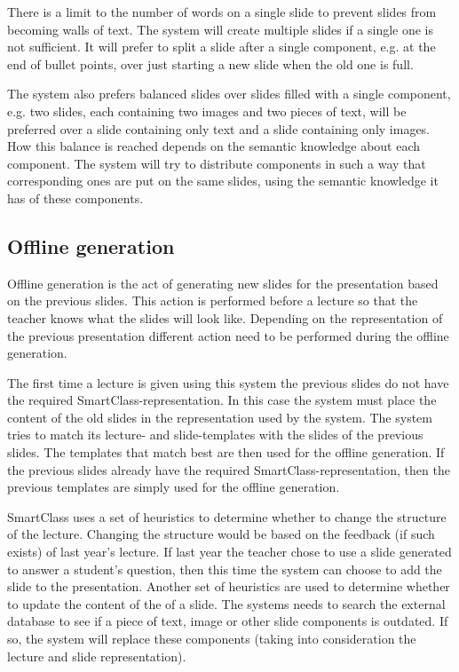 \documentclass[11pt]{article}
\begin{document}
There is a limit to the number of words on a single slide to prevent slides from becoming walls of text. The system will create multiple slides if a single one is not sufficient. It will prefer to split a slide after a single component, e.g. at the end of bullet points, over just starting a new slide when the old one is full. 

The system also prefers balanced slides over slides filled with a single component, e.g. two slides, each containing two images and two pieces of text, will be preferred over a slide containing only text and a slide containing only images. How this balance is reached depends on the semantic knowledge about each component. The system will try to distribute components in such a way that corresponding ones are put on the same slides, using the semantic knowledge it has of these components. 

\subsection{Offline generation}
Offline generation is the act of generating new slides for the presentation based on the previous slides. This action is performed before a lecture so that the teacher knows what the slides will look like. Depending on the representation of the previous presentation different action need to be performed during the offline generation. 

The first time a lecture is given using this system the previous slides do not have the required SmartClass-representation. In this case the system must place the content of the old slides in the representation used by the system. The system tries to match its lecture- and slide-templates with the slides of the previous slides. The templates that match best are then used for the offline generation. If the previous slides already have the required SmartClass-representation, then the previous templates are simply used for the offline generation.

SmartClass uses a set of heuristics to determine whether to change the structure of the lecture. Changing the structure would be based on the feedback (if such exists) of last year's lecture. If last year the teacher chose to use a slide generated to answer a student's question, then this time the system can choose to add the slide to the presentation. Another set of heuristics are used to determine whether to update the content of the of a slide. The systems needs to search the external database to see if a piece of text, image or other slide components is outdated. If so, the system will replace these components (taking into consideration the lecture and slide representation).
\end{document}
